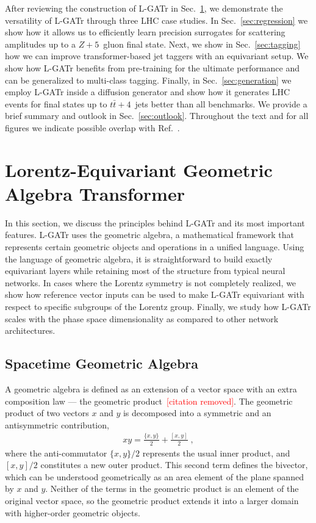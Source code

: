 \documentclass[submission, Phys]{SciPost}
\begin{document}
After reviewing the construction of L-GATr in Sec.~\ref{sec:lgatr}, we demonstrate the versatility of L-GATr through three LHC case studies. In Sec.~\ref{sec:regression} we show how it allows us to efficiently learn precision surrogates for scattering amplitudes up to a $Z+5$~gluon final state. Next, we show in Sec.~\ref{sec:tagging} how we can improve transformer-based jet taggers with an equivariant setup. We show how L-GATr benefits from pre-training for the ultimate performance and can be generalized to multi-class tagging. Finally, in Sec.~\ref{sec:generation} we employ L-GATr inside a diffusion generator and show how it generates LHC events for final states up to $t\bar{t}+4$~jets better than all benchmarks. 
%
We provide a brief summary and outlook in Sec.~\ref{sec:outlook}.
%
Throughout the text and for all figures we indicate possible overlap with Ref.~\cite{Spinner:2024hjm}.

\section{Lorentz-Equivariant Geometric Algebra Transformer}
\label{sec:lgatr}

In this section, we discuss the principles behind L-GATr and its most important features. L-GATr uses the geometric algebra, a mathematical framework that represents certain geometric objects and operations in a unified language. Using the language of geometric algebra, it is straightforward to build exactly equivariant layers while retaining most of the structure from typical neural networks. In cases where the Lorentz symmetry is not completely realized, we show how reference vector inputs can be used to make L-GATr equivariant with respect to specific subgroups of the Lorentz group. Finally, we study how L-GATr scales with the phase space dimensionality as compared to other network architectures.

\subsection{Spacetime Geometric Algebra}
\label{sec:algebra}

A geometric algebra is defined as an extension of a vector space with an extra composition law --- the geometric product\textcolor{red}{~[citation removed]}. The geometric product of two vectors $x$ and $y$ is decomposed into a symmetric and an antisymmetric contribution,
%
\begin{align}
    xy = \frac{\{x,y \}}{2} + \frac{[x,y]}{2}  \; ,
    \label{eq:xy_gen}
\end{align}
%
where the anti-commutator $\{x,y \}/2$ represents the usual inner product, and $[x,y]/2$ constitutes a new outer product. This second term defines the bivector, which can be understood geometrically as an area element of the plane spanned by $x$ and $y$. Neither of the terms in the geometric product is an element of the original vector space, so the geometric product extends it into a larger domain with higher-order geometric objects.
\end{document}
